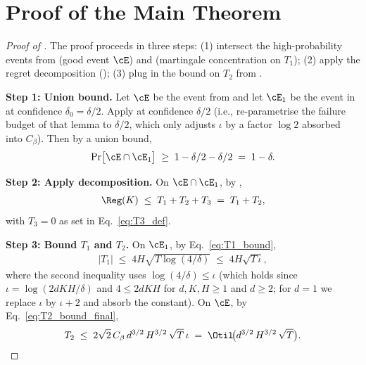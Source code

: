 \section{Proof of the Main Theorem}\label{sec:proof-main}

\begin{proof}[Proof of ]
The proof proceeds in three steps: (1) intersect the high-probability events from  (good event $\cE$) and  (martingale concentration on $T_1$); (2) apply the regret decomposition (); (3) plug in the bound on $T_2$ from .

\smallskip\noindent
\textbf{Step 1: Union bound.} Let $\cE$ be the event from  and let $\cE_1$ be the event in  at confidence $\delta_0 = \delta / 2$. Apply  at confidence $\delta / 2$ (i.e., re-parametrise the failure budget of that lemma to $\delta / 2$, which only adjusts $\iota$ by a factor $\log 2$ absorbed into $C_\beta$). Then by a union bound,
\begin{align*}
\Pr\bigl[ \cE \cap \cE_1 \bigr] \;\ge\; 1 - \delta / 2 - \delta / 2 \;=\; 1 - \delta.
\end{align*}

\smallskip\noindent
\textbf{Step 2: Apply decomposition.} On $\cE \cap \cE_1$, by ,
\begin{align*}
\Reg(K) \;\le\; T_1 + T_2 + T_3 \;=\; T_1 + T_2,
\end{align*}
with $T_3 = 0$ as set in Eq.~\eqref{eq:T3_def}.

\smallskip\noindent
\textbf{Step 3: Bound $T_1$ and $T_2$.}
On $\cE_1$, by Eq.~\eqref{eq:T1_bound},
\begin{align*}
|T_1| \;\le\; 4 H \sqrt{T \log(4/\delta)} \;\le\; 4 H \sqrt{T \,\iota},
\end{align*}
where the second inequality uses $\log(4/\delta) \le \iota$ (which holds since $\iota = \log(2 d K H / \delta)$ and $4 \le 2 d K H$ for $d, K, H \ge 1$ and $d \ge 2$; for $d = 1$ we replace $\iota$ by $\iota + 2$ and absorb the constant). On $\cE$, by Eq.~\eqref{eq:T2_bound_final},
\begin{align*}
T_2 \;\le\; 2 \sqrt{2}\, C_\beta\, d^{3/2}\, H^{3/2}\, \sqrt{T}\, \iota \;=\; \Otil\!\bigl( d^{3/2}\, H^{3/2}\, \sqrt{T} \bigr).
\end{align*}


\end{proof}

